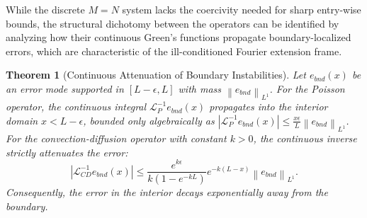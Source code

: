 \documentclass[pdflatex,sn-mathphys-num]{sn-jnl}%
\theoremstyle{thmstyleone}%
\newtheorem{theorem}{Theorem}
\newcommand{\norm}[1]{\left\lVert#1\right\rVert}
\begin{document}
While the discrete $M=N$ system lacks the coercivity needed for sharp entry-wise bounds, the structural dichotomy between the operators can be identified by analyzing how their continuous Green's functions propagate boundary-localized errors, which are characteristic of the ill-conditioned Fourier extension frame.

\begin{theorem}[Continuous Attenuation of Boundary Instabilities]
\label{thm:boundary_attenuation}
Let $e_{bnd}(x)$ be an error mode supported in $[L-\epsilon, L]$ with mass $\norm{e_{bnd}}_{L^1}$. 
For the Poisson operator, the continuous integral $\mathcal{L}_P^{-1} e_{bnd}(x)$ propagates into the interior domain $x < L-\epsilon$, bounded only algebraically as $|\mathcal{L}_P^{-1} e_{bnd}(x)| \le \frac{x\epsilon}{L} \norm{e_{bnd}}_{L^1}$.
For the convection-diffusion operator with constant $k > 0$, the continuous inverse strictly attenuates the error:
\begin{equation} |\mathcal{L}_{CD}^{-1} e_{bnd}(x)| \le \frac{e^{k\epsilon}}{k(1-e^{-kL})} e^{-k(L-x)} \norm{e_{bnd}}_{L^1}. \end{equation}
Consequently, the error in the interior decays exponentially away from the boundary.
\end{theorem}
\end{document}
